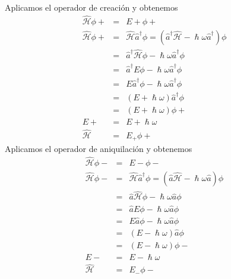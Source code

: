 \documentclass[letterpaper,12pt,oneside]{book}
\begin{document}
%
%
%
%
%
%
%
%
Aplicamos el operador de creaci\'on y obtenemos
%
\begin{eqnarray}
\mathcal{\hat H} \phi{\scriptstyle +} &=& E{\scriptstyle +}\phi{\scriptstyle +}\\
\mathcal{\hat H} \phi{\scriptstyle +} &=& \mathcal{\hat H} \hat a^\dagger \phi = (\hat a^\dagger \mathcal{\hat H} - \hslash \omega \hat a^\dagger)\phi\\
&=& \hat a^\dagger \mathcal{\hat H} \phi - \hslash \omega \hat a^\dagger \phi\\
&=& \hat a^\dagger E \phi - \hslash \omega \hat a^\dagger \phi\\
&=& E \hat a^\dagger \phi - \hslash \omega \hat a^\dagger \phi\\
&=& (E+\hslash \omega) \hat a^\dagger \phi \\
&=& (E+\hslash \omega)\phi{\scriptstyle +}\\
E{\scriptstyle +}&=&E+\hslash \omega\\
\mathcal{\hat H} &=& E_{+}\phi{\scriptstyle +}
\end{eqnarray}
%
Aplicamos el operador de aniquilación y obtenemos
%
\begin{eqnarray}
\mathcal{\hat H} \phi{\scriptstyle -} &=& E{\scriptstyle -}\phi{\scriptstyle -}\\
\mathcal{\hat H} \phi{\scriptstyle -} &=& \mathcal{\hat H} \hat a^\dagger \phi = (\hat a \mathcal{\hat H} - \hslash \omega \hat a)\phi\\
&=& \hat a \mathcal{\hat H} \phi - \hslash \omega \hat a \phi\\
&=& \hat a E \phi - \hslash \omega \hat a \phi\\
&=& E \hat a \phi - \hslash \omega \hat a \phi\\
&=& (E-\hslash \omega) \hat a \phi \\
&=& (E-\hslash \omega)\phi{\scriptstyle -}\\
E{\scriptstyle -}&=&E-\hslash \omega\\
\mathcal{\hat H} &=& E_{-}\phi{\scriptstyle -}
\end{eqnarray}
\end{document}
